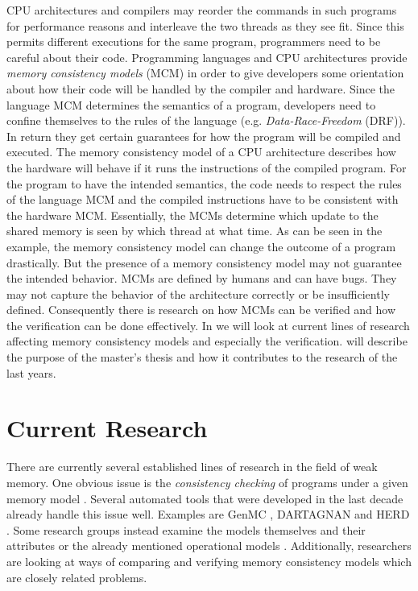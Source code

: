 \documentclass[a4paper,11pt,twoside, english]{article}
\begin{document}
CPU architectures and compilers may reorder the commands in such programs for performance reasons and interleave the two threads as they see fit.
Since this permits different executions for the same program, programmers need to be careful about their code. Programming languages and CPU architectures provide \textit{memory consistency models} (MCM) in order to give developers some orientation about how their code will be handled by the compiler and hardware.
Since the language MCM determines the semantics of a program, developers need to confine themselves to the rules of the language (e.g. \textit{Data-Race-Freedom} (DRF)). In return they get certain guarantees for how the program will be compiled and executed. 
The memory consistency model of a CPU architecture describes how the hardware will behave if it runs the instructions of the compiled program. For the program to have the intended semantics, the code needs to respect the rules of the language MCM and the compiled instructions have to be consistent with the hardware MCM.
Essentially, the MCMs determine which update to the shared memory is seen by which thread at what time. As can be seen in the example, the memory consistency model can change the outcome of a program drastically. But the presence of a memory consistency model may not guarantee the intended behavior. MCMs are defined by humans and can have bugs. They may not capture the behavior of the architecture correctly or be insufficiently defined.
Consequently there is research on how MCMs can be verified and how the verification can be done effectively. In  we will look at current lines of research affecting memory consistency models and especially the verification.
 will describe the purpose of the master's thesis and how it contributes to the research of the last years. 

\section{Current Research} \label{sec:CR}
There are currently several established lines of research in the field of weak memory.
One obvious issue is the \textit{consistency checking} of programs under a given memory model \cite{Tun+23,KokVaf21}. Several automated tools that were developed in the last decade already handle this issue well. Examples are GenMC \cite{KokVaf21}, DARTAGNAN \cite{Pon+18} and HERD \cite{Alg+14}.
Some research groups instead examine the models themselves and their attributes \cite{LahBok22} or the already mentioned operational models \cite{Ior+23,Doh+22}. 
Additionally, researchers are looking at ways of comparing \cite{Wic+17,Sha+23} and verifying \cite{Kok+23,And+25,Kir+20} memory consistency models which are closely related problems.\\
\end{document}
